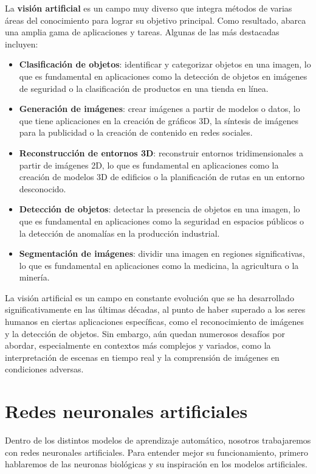 La \textbf{visión artificial} es un campo muy diverso que integra métodos de varias áreas del conocimiento para lograr su objetivo principal. Como resultado, abarca una amplia gama de aplicaciones y tareas. Algunas de las más destacadas incluyen:

\begin{itemize} 
	\item \textbf{Clasificación de objetos}: identificar y categorizar objetos en una imagen, lo que es fundamental en aplicaciones como la detección de objetos en imágenes de seguridad o la clasificación de productos en una tienda en línea. 
	\item \textbf{Generación de imágenes}: crear imágenes a partir de modelos o datos, lo que tiene aplicaciones en la creación de gráficos 3D, la síntesis de imágenes para la publicidad o la creación de contenido en redes sociales. 
	\item \textbf{Reconstrucción de entornos 3D}: reconstruir entornos tridimensionales a partir de imágenes 2D, lo que es fundamental en aplicaciones como la creación de modelos 3D de edificios o la planificación de rutas en un entorno desconocido. 
	\item \textbf{Detección de objetos}: detectar la presencia de objetos en una imagen, lo que es fundamental en aplicaciones como la seguridad en espacios públicos o la detección de anomalías en la producción industrial. 
	\item \textbf{Segmentación de imágenes}: dividir una imagen en regiones significativas, lo que es fundamental en aplicaciones como la medicina, la agricultura o la minería. 
\end{itemize}

La visión artificial es un campo en constante evolución que se ha desarrollado significativamente en las últimas décadas, al punto de haber superado a los seres humanos en ciertas aplicaciones específicas, como el reconocimiento de imágenes y la detección de objetos. Sin embargo, aún quedan numerosos desafíos por abordar, especialmente en contextos más complejos y variados, como la interpretación de escenas en tiempo real y la comprensión de imágenes en condiciones adversas.

\section{Redes neuronales artificiales}

Dentro de los distintos modelos de aprendizaje automático, nosotros trabajaremos con redes neuronales artificiales. Para entender mejor su funcionamiento, primero hablaremos de las neuronas biológicas y su inspiración en los modelos artificiales.

